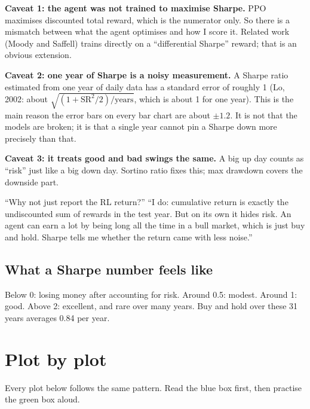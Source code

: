 \documentclass[11pt,a4paper]{article}
\begin{document}
\textbf{Caveat 1: the agent was not trained to maximise Sharpe.} PPO maximises discounted
total reward, which is the numerator only. So there is a mismatch between what the agent
optimises and how I score it. Related work (Moody and Saffell) trains directly on a
``differential Sharpe'' reward; that is an obvious extension.

\textbf{Caveat 2: one year of Sharpe is a noisy measurement.} A Sharpe ratio estimated from
one year of daily data has a standard error of roughly 1 (Lo, 2002: about
$\sqrt{(1 + \text{SR}^2/2)/\text{years}}$, which is about 1 for one year). This is the main
reason the error bars on every bar chart are about $\pm 1.2$. It is not that the models are
broken; it is that a single year cannot pin a Sharpe down more precisely than that.

\textbf{Caveat 3: it treats good and bad swings the same.} A big up day counts as ``risk''
just like a big down day. Sortino ratio fixes this; max drawdown covers the downside part.

\begin{qa}{``Why not just report the RL return?''}
``I do: cumulative return is exactly the undiscounted sum of rewards in the test year. But
on its own it hides risk. An agent can earn a lot by being long all the time in a bull
market, which is just buy and hold. Sharpe tells me whether the return came with less
noise.''
\end{qa}

\subsection{What a Sharpe number feels like}
Below 0: losing money after accounting for risk. Around 0.5: modest. Around 1: good.
Above 2: excellent, and rare over many years. Buy and hold over these 31 years averages
0.84 per year.

\section{Plot by plot}

Every plot below follows the same pattern. Read the blue box first, then practise the green
box aloud.

\end{document}
